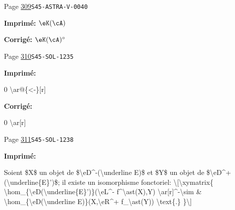\begin{description}
\smallskip
\item[\hypertarget{apparatus:FR-0309}{309}] Page \hyperlink{printpage:fr:309}{309}\quad\texttt{S45-ASTRA-V-0040}
\par\noindent\textbf{Imprimé:} \(\eK(\cA)\)
\par\noindent\textbf{Corrigé:} \(\eK(\cA)^\circ\)
\smallskip
\item[\hypertarget{apparatus:FR-0310}{310}] Page \hyperlink{printpage:fr:310}{310}\quad\texttt{S45-SOL-1235}
\par\noindent\textbf{Imprimé:} {\footnotesize\ttfamily\raggedright 0 \textbackslash{}\allowbreak{}ar@\{\allowbreak{}<-\allowbreak{}\}\allowbreak{}[\allowbreak{}r]\allowbreak{}\par}
\par\noindent\textbf{Corrigé:} {\footnotesize\ttfamily\raggedright 0 \textbackslash{}\allowbreak{}ar[\allowbreak{}r]\allowbreak{}\par}
\smallskip
\item[\hypertarget{apparatus:FR-0311}{311}] Page \hyperlink{printpage:fr:311}{311}\quad\texttt{S45-SOL-1238}
\par\noindent\textbf{Imprimé:} {\footnotesize\ttfamily\raggedright Soient \$X\$ un objet de \$\textbackslash{}\allowbreak{}eD\textasciicircum{}\allowbreak{}-\allowbreak{}(\allowbreak{}\textbackslash{}\allowbreak{}underline E)\allowbreak{}\$ et \$Y\$ un objet de  \$\textbackslash{}\allowbreak{}eD\textasciicircum{}\allowbreak{}+\allowbreak{}(\allowbreak{}\textbackslash{}\allowbreak{}underline\{\allowbreak{}E\}\allowbreak{}')\allowbreak{}\$; il existe un isomorphisme fonctoriel:  \textbackslash{}\allowbreak{}[\allowbreak{}\textbackslash{}\allowbreak{}xymatrix\{\allowbreak{}   \textbackslash{}\allowbreak{}hom\_\allowbreak{}\{\allowbreak{}\textbackslash{}\allowbreak{}eD(\allowbreak{}\textbackslash{}\allowbreak{}underline\{\allowbreak{}E\}\allowbreak{}')\allowbreak{}\}\allowbreak{}(\allowbreak{}\textbackslash{}\allowbreak{}eL\textasciicircum{}\allowbreak{}-\allowbreak{} f\textasciicircum{}\allowbreak{}\textbackslash{}\allowbreak{}ast(\allowbreak{}X)\allowbreak{},\allowbreak{}Y)\allowbreak{} \textbackslash{}\allowbreak{}ar[\allowbreak{}r]\allowbreak{}\textasciicircum{}\allowbreak{}-\allowbreak{}\textbackslash{}\allowbreak{}sim      \& \textbackslash{}\allowbreak{}hom\_\allowbreak{}\{\allowbreak{}\textbackslash{}\allowbreak{}eD(\allowbreak{}\textbackslash{}\allowbreak{}underline E)\allowbreak{}\}\allowbreak{}(\allowbreak{}X,\allowbreak{}\textbackslash{}\allowbreak{}eR\textasciicircum{}\allowbreak{}+\allowbreak{} f\_\allowbreak{}\textbackslash{}\allowbreak{}ast(\allowbreak{}Y)\allowbreak{})\allowbreak{} \textbackslash{}\allowbreak{}text\{\allowbreak{}.\}\allowbreak{} \}\allowbreak{}\textbackslash{}\allowbreak{}]\allowbreak{}\par}

\end{description}
